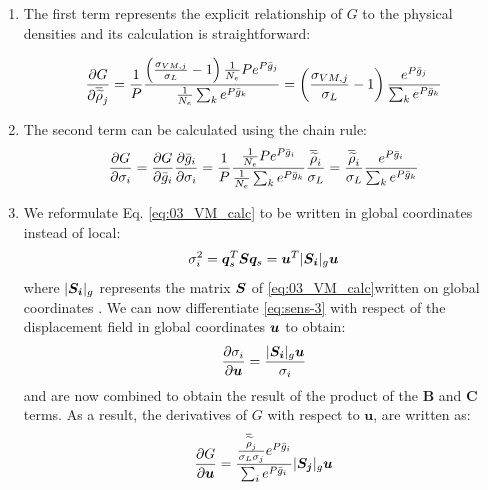 \begin{enumerate}[label=\Alph* -]
    \item The first term represents the explicit relationship of $G$ to the physical densities and its calculation is straightforward: 

    \begin{equation} \label{eq:sens-2-1}
        \frac{\partial G}{\partial \overline{\widetilde{\rho}}_j} = \frac{1}{P} \frac{\left(\frac{ \sigma_{VM,j}}{\sigma_L}-1 \right)\frac{1}{N_e} P e^{{P}\bar{g}_j}}{\frac{1}{N_e} \sum_k e^{{P}\bar{g}_k}} = \left(\frac{ \sigma_{VM,j}}{\sigma_L}-1 \right) \frac{e^{{P}\bar{g}_j}}{\sum_k e^{{P}\bar{g}_k}}
    \end{equation}
    
    \item The second term can be calculated using the chain rule:
    \begin{equation}
        \label{eq:sens-2-2}
        \frac{\partial G}{\partial\sigma_i} = \frac{\partial G}{\partial\bar{g}_i} \frac{\partial\bar{g}_i}{\partial\sigma_i} = \frac{1}{P} \frac{\frac{1}{N_e} P e^{{P}\bar{g}_i}}{\frac{1}{N_e} \sum_k e^{{P}\bar{g}_k}} \frac{\overline{\widetilde{\rho}}_i}{\sigma_L} = \frac{\overline{\widetilde{\rho}}_i}{\sigma_L} \frac{e^{{P}\bar{g}_i}}{\sum_k e^{{P}\bar{g}_k}}
    \end{equation}
    
    \item We reformulate Eq. \ref{eq:03_VM_calc} to be written in global coordinates instead of local:
    \begin{equation}
        \label{eq:sens-3}
        \sigma_i^2 = \bm{q}_s^T\bm{S}\bm{q}_s = \bm{u}^T |\bm{S_i}|_g \bm{u}
    \end{equation}  
    where $|\bm{S_i}|_g$ represents the matrix $\bm{S}$ of \eqref{eq:03_VM_calc}written on global coordinates . We can now differentiate \eqref{eq:sens-3} with respect of the displacement field in global coordinates $\bm{u}$ to obtain:
    \begin{equation}
        \label{eq:sens-4}
        \frac{\partial\sigma_i}{\partial\bm{u}} = \frac{|\bm{S_i}|_g \bm{u}}{\sigma_i}
    \end{equation}
     and  are now combined to obtain the result of the product of the \textbf{B} and \textbf{C} terms. As a result, the derivatives of $G$ with respect to $\bm{u}$, are written as:
    \begin{equation} \label{eq:sens-4-1}
        \frac{\partial G}{\partial\bm{u}} = \frac{\frac{\overline{\widetilde{\rho}}_j}{\sigma_L\sigma_j} e^{{P}\bar{g}_i}}{\sum_i e^{{P}\bar{g}_i}} |\bm{S_j}|_g \bm{u}
    \end{equation}


\end{enumerate}
